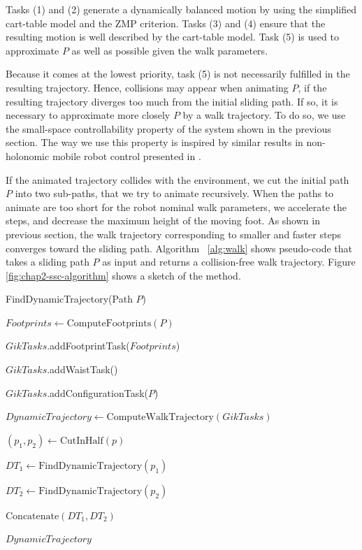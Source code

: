 Tasks (1) and (2) generate a dynamically balanced motion by using the
simplified cart-table model and the ZMP criterion. Tasks (3) and (4)
ensure that the resulting motion is well described by the cart-table
model. Task (5) is used to approximate $P$ as well as possible given
the walk parameters.

Because it comes at the  lowest priority, task (5) is not necessarily
fulfilled in  the resulting trajectory. Hence,  collisions may appear
when animating $P$, if the resulting trajectory diverges too much from
the initial sliding  path. If so, it is  necessary to approximate more
closely $P$  by a walk  trajectory.  To do  so, we use  the small-space
controllability  property   of  the  system  shown   in  the  previous
section. The way  we use this property is  inspired by similar results
in non-holonomic mobile robot control presented in \cite{taix-94}.

If the animated trajectory collides with the environment, we cut the
initial path $P$ into two sub-paths, that we try to animate
recursively. When the paths to animate are too short for the robot
nominal walk parameters, we accelerate the steps, and decrease the
maximum height of the moving foot. As shown in previous section, the
walk trajectory corresponding to smaller and faster steps converges
toward the sliding path.  Algorithm ~\ref{alg:walk} shows pseudo-code
that takes a sliding path $P$ as input and returns a collision-free
walk trajectory. Figure \ref{fig:chap2-ssc-algorithm} shows a sketch
of the method.

\begin{algorithm}
\caption{FindDynamicTrajectory(Path $P$)}
\label{alg:walk}
\begin{algorithmic}
\STATE $Footprints \leftarrow \text{ComputeFootprints}(P)$

\STATE $GikTasks$.addFootprintTask($Footprints$)

\STATE $GikTasks$.addWaistTask()

\STATE $GikTasks$.addConfigurationTask($P$)

\STATE $DynamicTrajectory \leftarrow
\text{ComputeWalkTrajectory}(GikTasks)$


\STATE $(p_1,p_2) \leftarrow \text{CutInHalf}(p)$

\STATE $DT_1 \leftarrow \text{FindDynamicTrajectory}(p_1)$

\STATE $DT_2 \leftarrow \text{FindDynamicTrajectory}(p_2)$

\RETURN $\text{Concatenate}(DT_1,DT_2)$

\ELSE

\RETURN $DynamicTrajectory$

\ENDIF
\end{algorithmic}
\end{algorithm}

